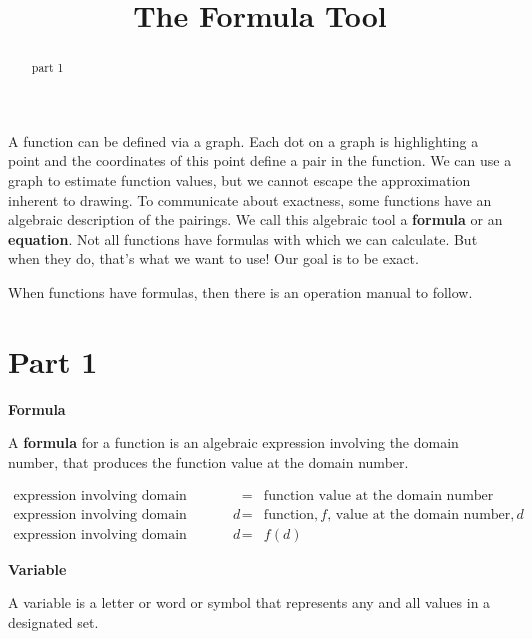 \documentclass{ximera}
\title{The Formula Tool}
\begin{document}
\begin{abstract}
part 1
\end{abstract}
\maketitle



A function can be defined via a graph. Each dot on a graph is highlighting a point and the coordinates of this point define a pair in the function. We can use a graph to estimate function values, but we cannot escape the approximation inherent to drawing.  To communicate about exactness, some functions have an algebraic description of the pairings.  We call this algebraic tool a \textbf{formula} or an \textbf{equation}. Not all functions have formulas with which we can calculate.  But when they do, that's what we want to use!  Our goal is to be exact. 


When functions have formulas, then there is an operation manual to follow. 



\section*{Part 1}

\begin{definition}  \textbf{\textcolor{green!50!black}{Formula}} 

A \textbf{formula} for a function is an algebraic expression involving the domain number, that produces the function value at the domain number.
\end{definition}



\[
\begin{array}{rcl}
     \text{expression involving domain number} & = &  \text{function value at the domain number}  \\ 
      \text{expression involving domain number,} \, d  & = &  \text{function,} \, f \text{, value at the domain number,} \, d \\ 
      \text{expression involving domain number,} \, d & = & f(d) 
\end{array}
\]







\begin{definition}  \textbf{\textcolor{green!50!black}{Variable}}  

A variable is a letter or word or symbol that represents any and all values in a designated set.


\end{definition}
\end{document}
